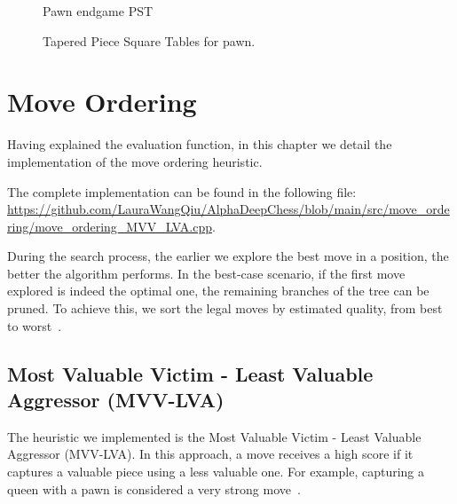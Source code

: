 \begin{figure}[H]
\begin{minipage}{0.4\textwidth}
        \caption*{Pawn endgame PST}
    \end{minipage}
    \caption{Tapered Piece Square Tables for pawn.}
    \label{fig:taperedPSTpawns}
\end{figure}

\newpage

\section{Move Ordering}

\noindent Having explained the evaluation function, in this chapter we detail the implementation of the move ordering heuristic.

\vspace{1em}

\noindent The complete implementation can be found in the following file:\\
\scriptsize\url{https://github.com/LauraWangQiu/AlphaDeepChess/blob/main/src/move_ordering/move_ordering_MVV_LVA.cpp}\normalsize.

\vspace{1em}

\noindent During the search process, the earlier we explore the best move in a position, the better the algorithm performs. In the best-case scenario, if the first move explored is indeed the optimal one, the remaining branches of the tree can be pruned. To achieve this, we sort the legal moves by estimated quality, from best to worst~\cite{MoveOrdering}.

\subsection*{Most Valuable Victim - Least Valuable Aggressor (MVV-LVA)}

\noindent The heuristic we implemented is the Most Valuable Victim - Least Valuable Aggressor (MVV-LVA). In this approach, a move receives a high score if it captures a valuable piece using a less valuable one. For example, capturing a queen with a pawn is considered a very strong move~\cite{MVVLVA}.

